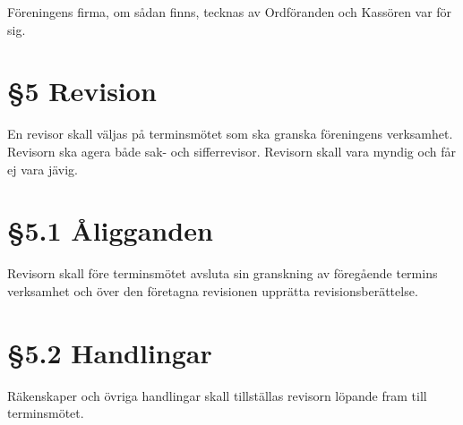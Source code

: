 \documentclass[]{article}
\begin{document}
Föreningens firma, om sådan finns, tecknas av Ordföranden och Kassören
var för sig.

\section{§5 Revision}\label{revision}

En revisor skall väljas på terminsmötet som ska granska föreningens
verksamhet. Revisorn ska agera både sak- och sifferrevisor. Revisorn
skall vara myndig och får ej vara jävig.

\section{§5.1 Åligganden}\label{uxe5ligganden}

Revisorn skall före terminsmötet avsluta sin granskning av föregående
termins verksamhet och över den företagna revisionen upprätta
revisionsberättelse.

\section{§5.2 Handlingar}\label{handlingar}

Räkenskaper och övriga handlingar skall tillställas revisorn löpande
fram till terminsmötet.
\end{document}
